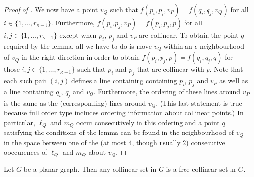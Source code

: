 \documentclass{patmorin}
\begin{document}
\begin{proof}[Proof of ]
   We now have a point $v_Q$ such that $f(p_i,p_j,v_P)=f(q_i,q_j,v_Q)$
   for all $i\in \{1,\ldots,r_{\kappa-1}\}$.  Furthermore,
   $f(p_i,p_j,v_P)=f(p_i,p_j,p)$ for all $i,j\in
   \{1,\ldots,r_{\kappa-1}\}$ except when $p_i$, $p_j$ and $v_P$ are
   collinear.  To obtain the point $q$ required by the lemma, all we
   have to do is move $v_Q$ within an $\epsilon$-neighbourhood of $v_Q$
   in the right direction in order to obtain $f(p_i,p_j,p)=f(q_i,q_j,q)$
   for those $i,j\in\{1,\ldots,r_{\kappa-1}\}$ such that $p_i$ and
   $p_j$ that are collinear with $p$.  Note that each such pair $(i,j)$
   defines a line containing containing $p_i$, $p_j$ and $v_P$ as well as
   a line containing $q_i$, $q_j$ and $v_Q$.  Furthermore, the ordering
   of these lines around $v_P$ is the same as the (corresponding) lines
   around $v_Q$.  (This last statement is true because full order type
   includes ordering information about collinear points.)  In particular,
   $\ell_Q$ and $m_Q$ occur consecutively in this ordering and a point $q$
   satisfying the conditions of the lemma can be found in the neighbourhood
   of $v_Q$ in the space between one of the (at most 4, though usually 2)
   consecutive ooccurences of $\ell_Q$ and $m_Q$ about $v_Q$.
\end{proof}

\begin{lem}
   Let $G$ be a planar graph.  Then any collinear set in $G$ is a free
   collinear set in $G$.
\end{lem}
\end{document}
